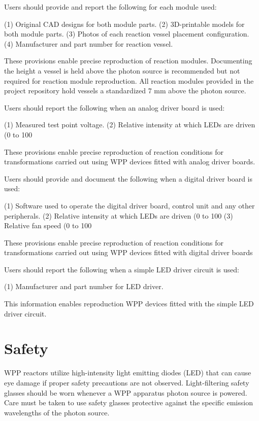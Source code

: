 \documentclass[11pt]{article}
\let\stdsection\section
\renewcommand\section{\clearpage\stdsection}
\begin{document}
Users should provide and report the following for each module used:

    (1) Original CAD designs for both module parts.
    (2) 3D-printable models for both module parts.
    (3) Photos of each reaction vessel placement configuration.
    (4) Manufacturer and part number for reaction vessel.

These provisions enable precise reproduction of reaction modules. Documenting the height a vessel is held above the photon source is recommended but not required for reaction module reproduction. All reaction modules provided in the project repository hold vessels a standardized 7 mm above the photon source.

Users should report the following when an analog driver board is used:

    (1) Measured test point voltage.
    (2) Relative intensity at which LEDs are driven (0 to 100%

These provisions enable precise reproduction of reaction conditions for transformations carried out using WPP devices fitted with analog driver boards.

Users should provide and document the following when a digital driver board is used:

    (1) Software used to operate the digital driver board, control unit and any other peripherals.
    (2) Relative intensity at which LEDs are driven (0 to 100%
    (3) Relative fan speed (0 to 100%

These provisions enable precise reproduction of reaction conditions for transformations carried out using WPP devices fitted with digital driver boards

Users should report the following when a simple LED driver circuit is used:

    (1) Manufacturer and part number for LED driver.

This information enables reproduction WPP devices fitted with the simple LED driver circuit.

\section{Safety}

WPP reactors utilize high-intensity light emitting diodes (LED) that can cause eye damage if proper safety precautions are not observed.
Light-filtering safety glasses should be worn whenever a WPP apparatus photon source is powered.
Care must be taken to use safety glasses protective against the specific emission wavelengths of the photon source.
\end{document}
